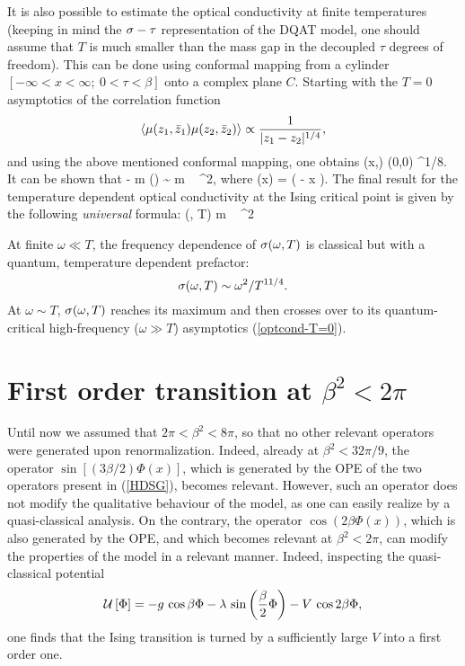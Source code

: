 It is also possible to estimate the optical conductivity at finite temperatures
(keeping in mind the $\sigma-\tau$ representation of the DQAT model, one
should assume that $T$ is much smaller than
the mass gap in the decoupled $\tau$ degrees of freedom). This can be done
using conformal mapping from
a cylinder $[-\infty < x < \infty; ~0 < \tau < \beta ]$ onto a complex
plane $C$. Starting with the $T=0$ asymptotics of the correlation function
$$
\langle \mu (z_1, \bar{z}_1) \mu (z_2, \bar{z}_2) \rangle
\propto \frac{1}{|z_1 - z_2|^{1/4}},
$$
and using the above mentioned conformal mapping, one obtains
\be
\la \mu (x,\tau) \mu (0,0) \ra \propto
{}^{1/8}.
\label{mu-mu-corr-finite-T}
\ee
It can be shown that\cite{SB}
\be
- \Im m \chi(\omega) \sim {} \Im m ~
^2,
\label{im-chi}
\ee
where
\be
\rho(x) = 
{\Gamma \left( - \ri x \right)}.
\label{ro}
\ee
The final result for the temperature dependent 
optical conductivity at the Ising
critical point is given by the following {\sl universal} formula:
\be
\s (\omega, T) \propto {}
\Im m ~
^2
\label{sigma-at-finite-T}
\ee

At finite $\omega \ll T$, the frequency dependence of $\sigma (\omega, T)$
is classical but with a quantum, temperature dependent prefactor:
$$
\sigma (\omega, T) \sim \omega^2 / T^{11/4}.
$$
At $\omega \sim T$, $\sigma (\omega, T)$ reaches its maximum and then crosses over
to its quantum-critical high-frequency ($\omega \gg T$) asymptotics
(\ref{optcond-T=0}).

\section{First order transition at $\beta^2<2\pi$}
 
Until now we assumed that $2\pi <\beta^2<8\pi$, so that no 
other relevant operators were generated upon renormalization.
Indeed, already at $\beta^2<32\pi/9$, the operator 
$\sin\left[\left(3\beta/2\right)\Phi(x)\right]$, which is 
generated by the OPE of the two operators present in 
(\ref{HDSG}), becomes relevant. However, such an operator 
does not modify the qualitative behaviour of the model, as 
one can easily realize by a quasi-classical analysis. 
On the contrary, the operator $\cos\left(2\beta\Phi(x)\right)$, 
which is also generated by the OPE, and which becomes 
relevant at $\beta^2<2\pi$, can modify the 
properties of the model in a relevant manner. Indeed,  
inspecting the quasi-classical potential
\[
{\cal U}\left[\Phi\right] = - g\,\cos\beta\Phi - 
\lambda\, \sin\left(\frac{\beta}{2}\Phi\right) 
- V\, \cos 2\beta\Phi,
\]
one finds that the Ising transition is turned by a 
sufficiently large $V$ into a first order one.

